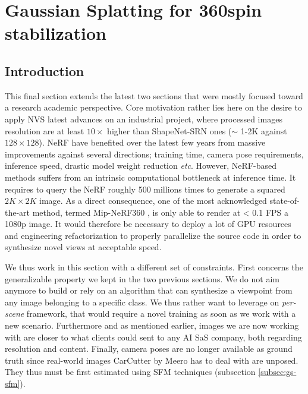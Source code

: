 \chapter{Gaussian Splatting for 360\degree spin stabilization}
\label{chapter:gausssplat}

 




\section{Introduction}
This final section extends the latest two sections that were mostly focused toward a research academic perspective. Core motivation rather lies here on the desire to apply \ac{NVS} latest advances on an industrial project, where processed images resolution are at least $10\times$ higher than ShapeNet-SRN \citep{chang2015shapenet,sitzmann2019scene} ones ($\sim$ 1-2K against $128\times128$). \ac{NeRF} have benefited over the latest few years from massive improvements against several directions; training time, camera pose requirements, inference speed, drastic model weight reduction \textit{etc}. 
However, \ac{NeRF}-based methods suffers from an intrinsic computational bottleneck at inference time. It requires to query the \ac{NeRF} roughly 500 millions times to generate a squared $2K\times2K$ image. As a direct consequence, one of the most acknowledged state-of-the-art method, termed Mip-NeRF360 \citep{barron2022mip}, is only able to render at < 0.1 \ac{FPS} a 1080p image. It would therefore be necessary to deploy a lot of \ac{GPU} resources and engineering refactorization to properly parallelize the source code in order to synthesize novel views at acceptable speed. 

We thus work in this section with a different set of constraints. First concerns the generalizable property we kept in the two previous sections. We do not aim anymore to build or rely on an algorithm that can synthesize a viewpoint from any image belonging to a specific class. We thus rather want to leverage on \textit{per-scene} framework, that would require a novel training as soon as we work with a new scenario. Furthermore and as mentioned earlier, images we are now working with are closer to what clients could sent to any \ac{AI} SaS company, both regarding resolution and content. Finally, camera poses are no longer available as ground truth since real-world images CarCutter by Meero has to deal with are unposed. They thus must be first estimated using \ac{SFM} techniques (subsection \ref{subsec:gs-sfm}).

